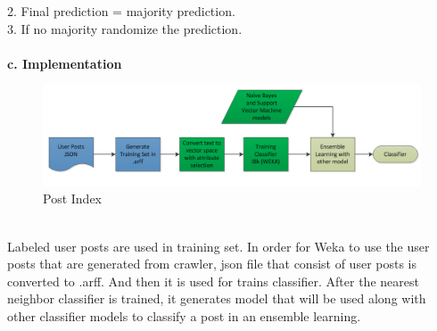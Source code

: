 		   2. Final prediction = majority prediction.\\
		   3. If no majority randomize the prediction.\\\\
	\textbf{c. Implementation} \\
	\begin{figure}[h]
		\begin{center}
			\includegraphics[scale=0.45]{images/Nearest.png}
		\caption{Post Index\label{Nearest}}
		\end{center}
	\end{figure}
	\\Labeled user posts are used in training set. In order for Weka to use the user posts that are generated from crawler, json file that consist of user posts is converted to .arff. And then it is used for trains classifier. After the nearest neighbor classifier is trained, it generates model that will be used along with other classifier models to classify a post in an ensemble learning.\
